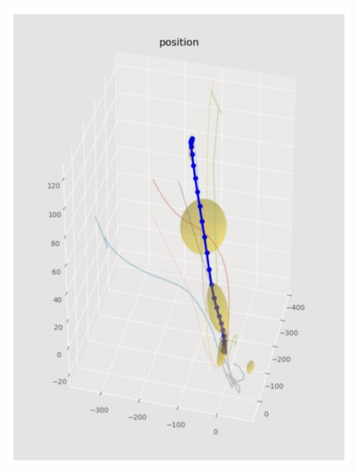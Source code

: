 \begin{figure}[htbp]
\begin{minipage}{0.60\hsize}
\begin{center}
\begin{minipage}{0.45\hsize}
\begin{center}
        \end{center}
      \end{minipage}
      \begin{minipage}{0.45\hsize}
        \begin{center}
          \includegraphics[clip,width=\hsize]{./figs/push_button_repro2.png}
        \end{center}
      \end{minipage}
      \begin{minipage}{0.45\hsize}
        \begin{center}

\end{center}
\end{minipage}
\end{center}
\end{minipage}
\end{figure}
